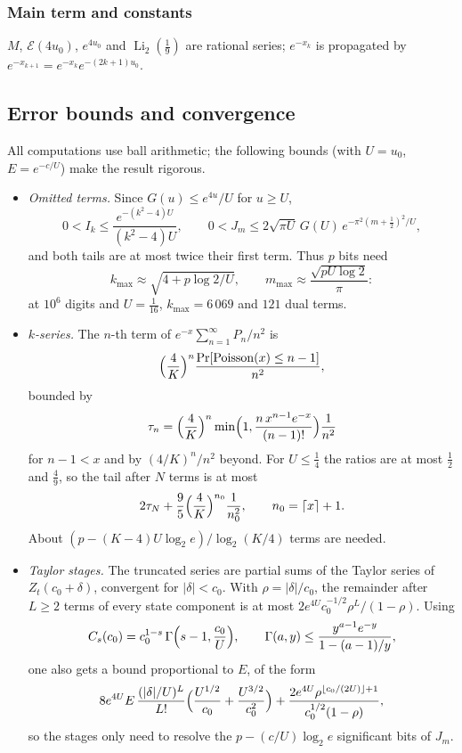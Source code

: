 \documentclass[11pt]{amsart}
\theoremstyle{definition}
\theoremstyle{remark}
\newcommand{\Eip}{\mathcal{E}}
\newcommand{\Li}{\operatorname{Li}}
\begin{document}
\subsubsection{Main term and constants} $M$, $\Eip(4u_0)$, $e^{4u_0}$ and $\Li_2(\frac19)$ are rational series;
$e^{-x_k}$ is propagated by $e^{-x_{k+1}} = e^{-x_k}e^{-(2k+1)u_0}$.

\subsection{Error bounds and convergence}\label{sec:khbounds}
All computations use ball arithmetic; the following bounds (with $U = u_0$, $E = e^{-c/U}$) make the result rigorous.

\begin{itemize}
\item \emph{Omitted terms.} Since $G(u) \le e^{4u}/U$ for $u \ge U$,
\[
  0 < I_k \le \frac{e^{-(k^2-4)U}}{(k^2-4)U}, \qquad 0 < J_m \le 2\sqrt{\pi U}\,G(U)\,e^{-\pi^2(m+\frac12)^2/U},
\]
and both tails are at most twice their first term. Thus $p$ bits need
\[
  k_{\max} \approx \sqrt{4 + p\log2/U}, \qquad m_{\max} \approx \frac{\sqrt{pU\log 2}}{\pi}:
\]
at $10^6$ digits and $U = \frac1{16}$, $k_{\max} = 6\,069$ and $121$ dual terms.
\item \emph{$k$-series.} The $n$-th term of $e^{-x}\sum_{n=1}^{\infty} P_n/n^2$ is
\[
  \Bigl(\frac4K\Bigr)^n\frac{\Pr[\mathrm{Poisson}(x) \le n-1]}{n^2},
\]
bounded by
\[
  \tau_n = \Bigl(\frac4K\Bigr)^n\min\Bigl(1, \frac{n\,x^{n-1}e^{-x}}{(n-1)!}\Bigr)\frac{1}{n^2}
\]
for $n - 1 < x$ and by $(4/K)^n/n^2$ beyond. For $U \le \frac14$ the ratios are at most $\frac12$ and $\frac49$, so
the tail after $N$ terms is at most
\[
  2\tau_N + \frac95\Bigl(\frac4K\Bigr)^{n_0}\frac1{n_0^2}, \qquad n_0 = \lceil x\rceil + 1.
\]
About $(p - (K-4)U\log_2e)/\log_2(K/4)$ terms are needed.
\item \emph{Taylor stages.} The truncated series are partial sums of the Taylor series of $Z_t(c_0+\delta)$,
convergent for $|\delta| < c_0$. With $\rho = |\delta|/c_0$, the remainder after $L \ge 2$ terms of every state
component is at most $2e^{4U}c_0^{-1/2}\rho^L/(1-\rho)$. Using
\[
  C_s(c_0) = c_0^{1-s}\,\Gamma\Bigl(s-1, \frac{c_0}U\Bigr), \qquad \Gamma(a, y) \le \frac{y^{a-1}e^{-y}}{1 - (a-1)/y},
\]
one also gets a bound proportional to $E$, of the form
\[
  8e^{4U}E\,\frac{(|\delta|/U)^L}{L!}\Bigl(\frac{U^{1/2}}{c_0} + \frac{U^{3/2}}{c_0^2}\Bigr)
  + \frac{2e^{4U}\rho^{\lfloor c_0/(2U)\rfloor+1}}{c_0^{1/2}(1-\rho)},
\]
so the stages only need to resolve the $p - (c/U)\log_2 e$ significant bits of $J_m$.

\end{itemize}
\end{document}
